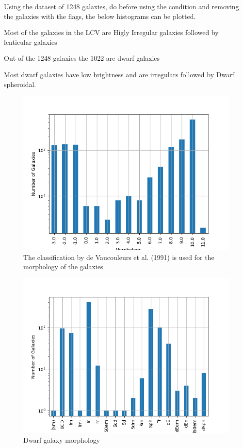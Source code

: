 \documentclass[a4paper,twocolumn]{article}
\begin{document}
Using the dataset of 1248 galaxies, do before using the condition and removing the galaxies with the flags, the below histograms can be plotted.

Most of the galaxies in the LCV are Higly Irregular galaxies followed by lenticular galaxies

Out of the 1248 galaxies the 1022 are dwarf galaxies


Most dwarf galaxies have low brightness and are irregulars followed by Dwarf spheroidal.

\begin{figure}[htbp]
\centering
\includegraphics[width=.9\linewidth]{./figs/hist-Type.png}
\caption{\label{Types of galaxies}The classification by de Vaucouleurs et al. (1991) is used for the morphology of the galaxies}
\end{figure}

\begin{figure}[htbp]
\centering
\includegraphics[width=.9\linewidth]{./figs/hist-Tdw1.png}
\caption{\label{Types of dwarf galaxies}Dwarf galaxy morphology}
\end{figure}
\end{document}

